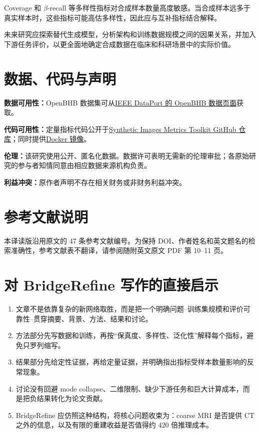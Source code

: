 \documentclass[UTF8,11pt,a4paper]{ctexart}
\begin{document}
Coverage 和 $\beta$-recall 等多样性指标对合成样本数量高度敏感。当合成样本远多于真实样本时，这些指标可能高估多样性，因此应与互补指标结合解释。

未来研究应探索替代生成模型，分析架构和训练数据规模之间的因果关系，并加入下游任务评价，以更全面地确定合成数据在临床和科研场景中的实际价值。

\section{数据、代码与声明}

\textbf{数据可用性：}OpenBHB 数据集可从\href{https://ieee-dataport.org/open-access/openbhb-multi-site-brain-mri-dataset-age-prediction-and-debiasing}{IEEE DataPort 的 OpenBHB 数据页面}获取。

\textbf{代码可用性：}定量指标代码公开于\href{https://github.com/aiformedresearch/Synthetic_Images_Metrics_Toolkit}{Synthetic Images Metrics Toolkit GitHub 仓库}；同时提供\href{https://hub.docker.com/r/aiformedresearch/metrics_toolkit}{Docker 镜像}。

\textbf{伦理：}该研究使用公开、匿名化数据。数据许可表明无需新的伦理审批；各原始研究的参与者知情同意由相应数据来源机构负责。

\textbf{利益冲突：}原作者声明不存在相关财务或非财务利益冲突。

\section{参考文献说明}

本译读版沿用原文的 47 条参考文献编号。为保持 DOI、作者姓名和英文题名的检索准确性，参考文献表不翻译，请参阅随附英文原文 PDF 第 10--11 页。

\section*{对 BridgeRefine 写作的直接启示}

\begin{enumerate}
\item 文章不是依靠复杂的新网络取胜，而是把一个明确问题--训练集规模和评价可靠性--贯穿摘要、背景、方法、结果和讨论。
\item 方法部分先写数据和训练，再按“保真度、多样性、泛化性”解释每个指标，避免只罗列缩写。
\item 结果部分先给定性证据，再给定量证据，并明确指出指标受样本数量影响的反常现象。
\item 讨论没有回避 mode collapse、二维限制、缺少下游任务和巨大计算成本，而是把负结果转化为论文贡献。
\item BridgeRefine 应仿照这种结构，将核心问题收束为：coarse MRI 是否提供 CT 之外的信息，以及有限的重建收益是否值得约 420 倍推理成本。
\end{enumerate}
\end{document}
